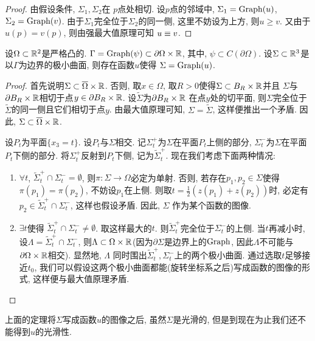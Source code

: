\begin{proof}
    由假设条件, $\Sigma_1,\Sigma_2$在 $p$点处相切. 设$p$点的邻域中, $\Sigma_1=\text{Graph}(u)$, $\Sigma_2=\text{Graph}(v)$. 由于$\Sigma_1$完全位于$\Sigma_2$的同一侧, 这里不妨设为上方, 则$u \ge v$. 又由于$u(p)=v(p)$, 则由强最大值原理可知  $u \equiv v$.
\end{proof}
\begin{theorem}
    设$\Omega \subset \mathbb{R}^2$是严格凸的. $\Gamma =\text{Graph}(\psi) \subset \partial \Omega \times \mathbb{R}$, 其中, $\psi \subset C(\partial \Omega)$. 设$\Sigma \subset \mathbb{R}^3$是以$\Gamma$为边界的极小曲面, 则存在函数$u$使得 $\Sigma=\text{Graph}(u)$.
\end{theorem}
\begin{proof}
    首先说明$\Sigma \subset \overline{\Omega} \times \mathbb{R}$. 否则, 取$x \in \Omega$, 取$R>0$使得$\Sigma \subset B_R\times \mathbb{R}$并且 $\Sigma$与$\partial B_R\times \mathbb{R}$相切于点$y \in \partial B_R \times \mathbb{R}$. 设$\tilde{\Sigma}$为$\partial B_R \times \mathbb{R}$ 在点$y$处的切平面, 则$\Sigma$完全位于$\tilde{\Sigma}$的同一侧且它们相切于点$y$. 由最大值原理可知, $\Sigma= \tilde{\Sigma}$, 这样便推出一个矛盾. 因此, $\Sigma \subset \overline{\Omega}\times \mathbb{R}$.
    \par 设$P_t$为平面$\{x_3=t\}$. 设$P_t$与$\Sigma$相交. 记$\Sigma_t^+$为$\Sigma$在平面$P_t$上侧的部分, $\Sigma_t^-$为$\Sigma$在平面$P_t$下侧的部分. 将$\Sigma_t^+$反射到$P_t$下侧, 记为$\tilde{\Sigma}_t^+$.  现在我们考虑下面两种情况:
    \begin{enumerate}
        \item  $\forall t$, $\tilde{\Sigma}_t^+\cap \Sigma_t^-=\emptyset$, 则$\pi:\Sigma\to \Omega$必定为单射. 否则, 若存在$p_1,p_2 \in \Sigma$使得 $\pi(p_1)=\pi(p_2)$, 不妨设$p_1$在上侧. 则取$t=\frac{1}{2}(z(p_1)+z(p_2))$时, 必定有$p_2 \in \tilde{\Sigma}_t^+\cap \Sigma_t^-$,  这样也假设矛盾. 因此, $\Sigma$ 作为某个函数的图像.
        \item $\exists t$使得 $\tilde{\Sigma}_t^+ \cap \Sigma_t^-\ne \emptyset$.  取这样最大的$t$. 则$\tilde{\Sigma}_t^+$完全位于$\Sigma_t^-$的上侧.  当$t$再减小时, 设$\Lambda=  \tilde{\Sigma}_t^+ \cap \Sigma_t^-$, 则$\Lambda \subset \Omega \times \mathbb{R}$(因为$\partial \Sigma$是边界上的$\text{Graph}$, 因此$\Lambda$不可能与$\partial \Omega \times \mathbb{R}$相交). 显然地, $\Lambda$ 同时围出$\tilde{\Sigma}_t^+, \Sigma_t^-$上的两个极小曲面. 通过选取$t$足够接近$t_0$, 我们可以假设这两个极小曲面都能(旋转坐标系之后)写成函数的图像的形式, 这样便与最大值原理矛盾.
    \end{enumerate}
\end{proof}
\begin{remark}
    上面的定理将$\Sigma$写成函数$u$的图像之后, 虽然$\Sigma$是光滑的, 但是到现在为止我们还不能得到$u$的光滑性.
\end{remark}
